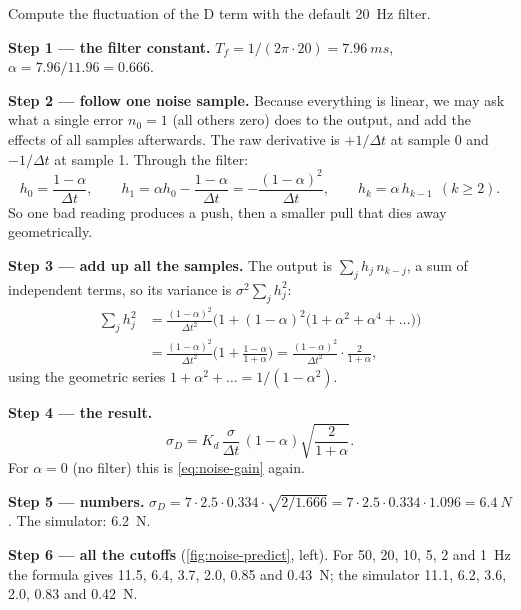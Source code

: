 \begin{example}
\label{ex:noise-filtered}
Compute the fluctuation of the D term with the default \SI{20}{Hz} filter.

\textbf{Step 1 — the filter constant.} $T_f = 1/(2\pi \cdot 20) = \SI{7.96}{ms}$, $\alpha = 7.96/11.96 = 0.666$.

\textbf{Step 2 — follow one noise sample.} Because everything is linear, we may ask what a single error $n_0 = 1$ (all others zero) does to the output, and add the effects of all samples afterwards. The raw derivative is $+1/\Delta t$ at sample 0 and $-1/\Delta t$ at sample 1. Through the filter:
\begin{equation*}
  h_0 = \frac{1-\alpha}{\Delta t}, \qquad h_1 = \alpha h_0 - \frac{1-\alpha}{\Delta t} = -\frac{(1-\alpha)^2}{\Delta t}, \qquad h_k = \alpha\,h_{k-1} \ \ (k \ge 2).
\end{equation*}
So one bad reading produces a push, then a smaller pull that dies away geometrically.

\textbf{Step 3 — add up all the samples.} The output is $\sum_j h_j\,n_{k-j}$, a sum of independent terms, so its variance is $\sigma^2\sum_j h_j^2$:
\begin{align*}
  \sum_j h_j^2 &= \frac{(1-\alpha)^2}{\Delta t^2}\Big(1 + (1-\alpha)^2\big(1 + \alpha^2 + \alpha^4 + \dots\big)\Big)\\
  &= \frac{(1-\alpha)^2}{\Delta t^2}\Big(1 + \frac{1-\alpha}{1+\alpha}\Big) = \frac{(1-\alpha)^2}{\Delta t^2}\cdot\frac{2}{1+\alpha},
\end{align*}
using the geometric series $1 + \alpha^2 + \dots = 1/(1-\alpha^2)$.

\textbf{Step 4 — the result.}
\begin{equation}\label{eq:noise-filtered}
  \sigma_D = K_d\,\frac{\sigma}{\Delta t}\,(1-\alpha)\sqrt{\frac{2}{1+\alpha}} .
\end{equation}
For $\alpha = 0$ (no filter) this is \cref{eq:noise-gain} again.

\textbf{Step 5 — numbers.} $\sigma_D = 7 \cdot 2.5 \cdot 0.334 \cdot \sqrt{2/1.666} = 7 \cdot 2.5 \cdot 0.334 \cdot 1.096 = \SI{6.4}{N}$. The simulator: \SI{6.2}{N}.

\textbf{Step 6 — all the cutoffs} (\cref{fig:noise-predict}, left). For 50, 20, 10, 5, 2 and \SI{1}{Hz} the formula gives 11.5, 6.4, 3.7, 2.0, 0.85 and \SI{0.43}{N}; the simulator 11.1, 6.2, 3.6, 2.0, 0.83 and \SI{0.42}{N}.
\end{example}

